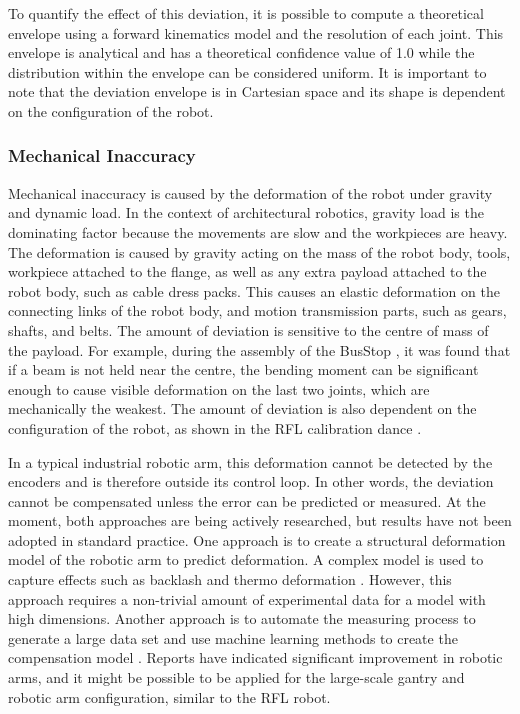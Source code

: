 To quantify the effect of this deviation, it is possible to compute a theoretical envelope using a forward kinematics model and the resolution of each joint. This envelope is analytical and has a theoretical confidence value of 1.0 while the distribution within the envelope can be considered uniform. It is important to note that the deviation envelope is in Cartesian space and its shape is dependent on the configuration of the robot.

\subsubsection{Mechanical Inaccuracy}
\label{subsubsection:new-hypo-mechanical-inaccuracy}

Mechanical inaccuracy is caused by the deformation of the robot under gravity and dynamic load. In the context of architectural robotics, gravity load is the dominating factor because the movements are slow and the workpieces are heavy. The deformation is caused by gravity acting on the mass of the robot body, tools, workpiece attached to the flange, as well as any extra payload attached to the robot body, such as cable dress packs. This causes an elastic deformation on the connecting links of the robot body, and motion transmission parts, such as gears, shafts, and belts. The amount of deviation is sensitive to the centre of mass of the payload. For example, during the assembly of the BusStop , it was found that if a beam is not held near the centre, the bending moment can be significant enough to cause visible deformation on the last two joints, which are mechanically the weakest. The amount of deviation is also dependent on the configuration of the robot, as shown in the RFL calibration dance .

In a typical industrial robotic arm, this deformation cannot be detected by the encoders and is therefore outside its control loop. In other words, the deviation cannot be compensated unless the error can be predicted or measured. At the moment, both approaches are being actively researched, but results have not been adopted in standard practice. One approach is to create a structural deformation model of the robotic arm to predict deformation. A complex model is used to capture effects such as backlash and thermo deformation \parencite{wuReviewIndustrialRobot2022}. However, this approach requires a non-trivial amount of experimental data for a model with high dimensions. Another approach is to automate the measuring process to generate a large data set and use machine learning methods to create the compensation model \parencite{yeHighaccuracyPredictionCompensation2022}. Reports have indicated significant improvement in robotic arms, and it might be possible to be applied for the large-scale gantry and robotic arm configuration, similar to the RFL robot.

